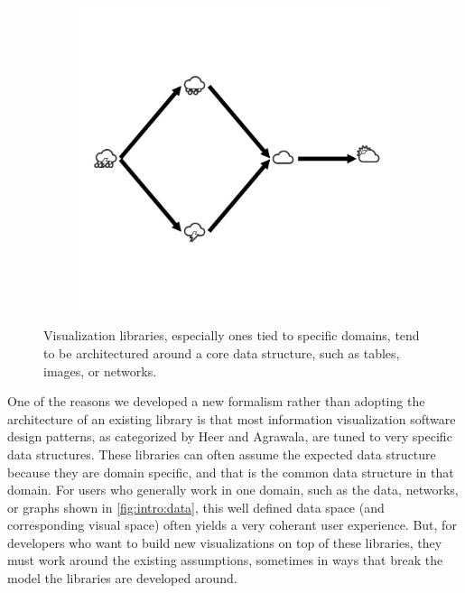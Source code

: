 \documentclass[../main.tex]{subfiles}
\begin{document}
\begin{figure}[H]
\begin{subfigure}{.3\textwidth}
        \includegraphics[width=1\textwidth]{figures/math/graph.png}
    \end{subfigure}
    \caption{Visualization libraries, especially ones tied to specific domains, tend to be architectured around a core data structure, such as tables, images, or networks. }
    \label{fig:intro:data}
\end{figure}

One of the reasons we developed a new formalism rather than adopting the architecture of an existing library is that most information visualization software design patterns, as categorized by Heer and Agrawala\cite{HeerSoftware2006}, are tuned to very specific data structures. These libraries can often assume the expected data structure because they are domain specific, and that is the common data structure in that domain.  For users who generally work in one domain, such as the data, networks, or graphs shown in \autoref{fig:intro:data}, this well defined data space (and corresponding visual space\cite{chiTaxonomyVisualizationTechniques2000}) often yields a very coherant user experience\cite{heerDeclarative2010}. But, for developers who want to build new visualizations on top of these libraries, they must work around the existing assumptions, sometimes in ways that break the model the libraries are developed around. 
\end{document}
